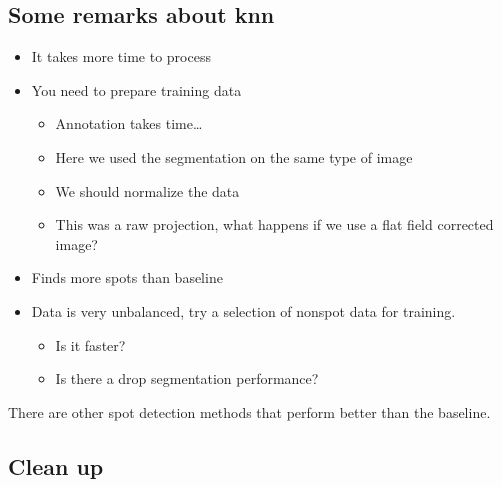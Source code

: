 \documentclass[letterpaper,10pt,english]{sphinxmanual}
\begin{document}
\subsection{Some remarks about k\sphinxhyphen{}nn}
\label{\detokenize{ML4NeutronImageSegmentation:some-remarks-about-k-nn}}\begin{itemize}
\item {} 
It takes more time to process

\item {} 
You need to prepare training data
\begin{itemize}
\item {} 
Annotation takes time…

\item {} 
Here we used the segmentation on the same type of image

\item {} 
We should normalize the data

\item {} 
This was a raw projection, what happens if we use a flat field corrected image?

\end{itemize}

\item {} 
Finds more spots than baseline

\item {} 
Data is very unbalanced, try a selection of non\sphinxhyphen{}spot data for training.
\begin{itemize}
\item {} 
Is it faster?

\item {} 
Is there a drop segmentation performance?

\end{itemize}

\end{itemize}

 There are other spot detection methods that perform better than the baseline.


\subsection{Clean up}
\label{\detokenize{ML4NeutronImageSegmentation:clean-up}}
\begin{sphinxVerbatim}[commandchars=\\\{\}]
 
\end{sphinxVerbatim}
\end{document}
